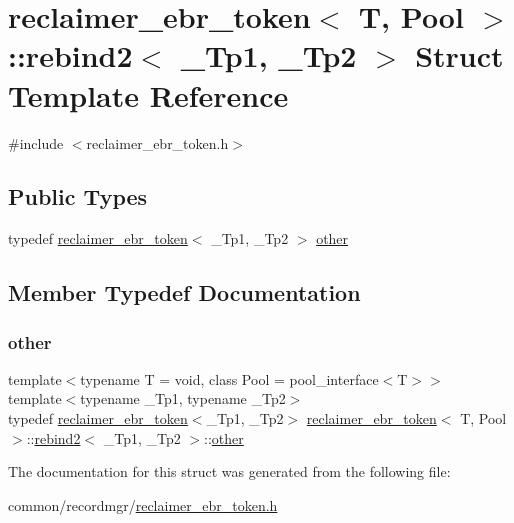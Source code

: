 \hypertarget{structreclaimer__ebr__token_1_1rebind2}{}\section{reclaimer\+\_\+ebr\+\_\+token$<$ T, Pool $>$\+:\+:rebind2$<$ \+\_\+\+Tp1, \+\_\+\+Tp2 $>$ Struct Template Reference}
\label{structreclaimer__ebr__token_1_1rebind2}


{\ttfamily \#include $<$reclaimer\+\_\+ebr\+\_\+token.\+h$>$}

\subsection*{Public Types}
\begin{DoxyCompactItemize}
\item 
typedef \hyperlink{classreclaimer__ebr__token}{reclaimer\+\_\+ebr\+\_\+token}$<$ \+\_\+\+Tp1, \+\_\+\+Tp2 $>$ \hyperlink{structreclaimer__ebr__token_1_1rebind2_aa88b225e156d82b041b8108ba189925b}{other}
\end{DoxyCompactItemize}


\subsection{Member Typedef Documentation}
\mbox{\label{structreclaimer__ebr__token_1_1rebind2_aa88b225e156d82b041b8108ba189925b}} 
\subsubsection{\texorpdfstring{other}{other}}
{\footnotesize\ttfamily template$<$typename T  = void, class Pool  = pool\+\_\+interface$<$\+T$>$$>$ \\
template$<$typename \+\_\+\+Tp1, typename \+\_\+\+Tp2$>$ \\
typedef \hyperlink{classreclaimer__ebr__token}{reclaimer\+\_\+ebr\+\_\+token}$<$\+\_\+\+Tp1, \+\_\+\+Tp2$>$ \hyperlink{classreclaimer__ebr__token}{reclaimer\+\_\+ebr\+\_\+token}$<$ T, Pool $>$\+::\hyperlink{structreclaimer__ebr__token_1_1rebind2}{rebind2}$<$ \+\_\+\+Tp1, \+\_\+\+Tp2 $>$\+::\hyperlink{structreclaimer__ebr__token_1_1rebind2_aa88b225e156d82b041b8108ba189925b}{other}}



The documentation for this struct was generated from the following file\+:\begin{DoxyCompactItemize}
\item 
common/recordmgr/\hyperlink{reclaimer__ebr__token_8h}{reclaimer\+\_\+ebr\+\_\+token.\+h}\end{DoxyCompactItemize}
